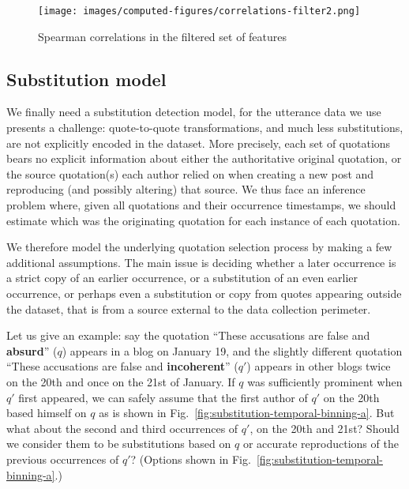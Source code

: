 \begin{figure}[!th]
    \centering
    \texttt{[image: images/computed-figures/correlations-filter2.png]}
    \caption{Spearman correlations in the filtered set of features}
    \label{fig:feature-corrs-filtered}
\end{figure}


\subsection{Substitution model}
\label{sec:temporal-binning}\label{sec:model}

We finally need a substitution detection model, for the utterance data we use presents a challenge: quote-to-quote transformations, and much less substitutions, are not explicitly encoded in the dataset. More precisely, each set of quotations bears no explicit information about either the authoritative original quotation, or the source quotation(s) each author relied on when creating a new post and reproducing (and possibly altering) that source.
We thus face an inference problem where, given all quotations and their occurrence timestamps, we should estimate which was the originating quotation for each instance of each quotation.

We therefore model the underlying quotation selection process by making a few additional assumptions. %
The main issue is deciding whether a later occurrence is a strict copy of an earlier occurrence, or a substitution of an even earlier occurrence, or perhaps even a substitution or copy from quotes appearing outside the dataset, that is from a source external to the data collection perimeter.

Let us give an example: say the quotation ``These accusations are false and \textbf{absurd}'' ($q$) appears in a blog on January 19, and the slightly different quotation ``These accusations are false and \textbf{incoherent}'' ($q'$) appears in other blogs twice on the 20th and once on the 21st of January.
If $q$ was sufficiently prominent when $q'$ first appeared, we can safely assume that the first author of $q'$ on the 20th based himself on $q$ as is shown in Fig.~\ref{fig:substitution-temporal-binning-a}.
But what about the second and third occurrences of $q'$, on the 20th and 21st?
Should we consider them to be substitutions based on $q$ %
or accurate reproductions of the previous occurrences of $q'$? (Options shown in Fig.~\ref{fig:substitution-temporal-binning-a}.)

